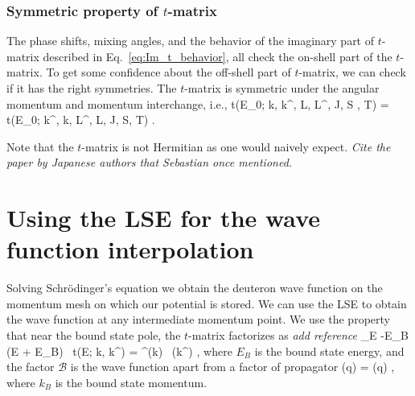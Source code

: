   \subsubsection{Symmetric property of $t$-matrix}

  The phase shifts, mixing angles, and the behavior of the imaginary part of
  $t$-matrix described in Eq.~\eqref{eq:Im_t_behavior}, all check the
  on-shell part of the $t$-matrix.  To get some confidence about the off-shell
  part of $t$-matrix, we can check if it has the right symmetries.
  The $t$-matrix is symmetric under the angular momentum and momentum
  interchange, i.e.,
  \beq
  t(E_0; k, k^\prime, L, L^\prime, J, S , T) = t(E_0; k^\prime, k, L^\prime, L,
  J, S, T) \;.
  \eeq

  Note that the $t$-matrix is not Hermitian as one would naively expect.
  \emph{Cite the paper by Japanese authors that Sebastian once mentioned.}

  \section{Using the LSE for the wave function interpolation}

  Solving Schr\"{o}dinger's equation we obtain the deuteron wave function
  on the momentum mesh on which our potential is stored.  We can use the LSE
  to obtain the wave function at any intermediate momentum point.
  We use the property that near the bound state pole, the $t$-matrix
  factorizes as \emph{add reference}
  \beq
  \lim_{E \to -E_B} (E + E_B) \, t(E; k, k^\prime) = ^\ast (k) \,
   (k^\prime) \;,
  \label{eq:t_near_pole}
  \eeq
  where $E_B$ is the bound state energy, and the factor $\mathcal{B}$ is
  the wave function apart from a factor of propagator
  \beq
  (q) =  \psi(q) \;,
  \label{eq:B_psi_relation}
  \eeq
  where $k_B$ is the bound state momentum.

